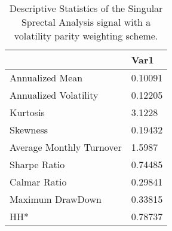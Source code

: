 \begin{table}[H]
\centering
\begin{tabular}{ll}
& Var1 \\ 
\hline 
Annualized Mean & 0.10091 \\ 
Annualized Volatility & 0.12205 \\ 
Kurtosis & 3.1228 \\ 
Skewness & 0.19432 \\ 
Average Monthly Turnover & 1.5987 \\ 
Sharpe Ratio & 0.74485 \\ 
Calmar Ratio & 0.29841 \\ 
Maximum DrawDown & 0.33815 \\ 
HH* & 0.78737 \\ 
\hline
\end{tabular}
\caption{Descriptive Statistics of the Singular Sprectal Analysis signal with a volatility parity weighting scheme.}
\label{SSA_Quantity}
\end{table}